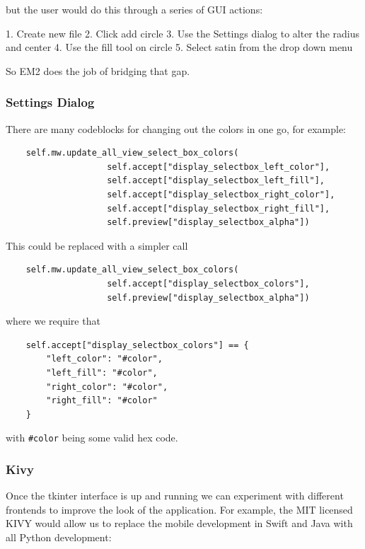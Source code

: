 \documentclass[a4paper, 11pt]{report}
\begin{document}
but the user would do this through a series of GUI actions:

1. Create new file
2. Click add circle
3. Use the Settings dialog to alter the radius and center
4. Use the fill tool on circle
5. Select satin from the drop down menu

So EM2 does the job of bridging that gap.

\subsubsection{Settings Dialog}

There are many codeblocks for changing out the colors in one go, for example:
    
\begin{verbatim}
    self.mw.update_all_view_select_box_colors(
                    self.accept["display_selectbox_left_color"],
                    self.accept["display_selectbox_left_fill"],
                    self.accept["display_selectbox_right_color"],
                    self.accept["display_selectbox_right_fill"],
                    self.preview["display_selectbox_alpha"])
\end{verbatim}

This could be replaced with a simpler call

\begin{verbatim}
    self.mw.update_all_view_select_box_colors(
                    self.accept["display_selectbox_colors"],
                    self.preview["display_selectbox_alpha"])
\end{verbatim}

where we require that

\begin{verbatim}
    self.accept["display_selectbox_colors"] == {
        "left_color": "#color",
        "left_fill": "#color",
        "right_color": "#color",
        "right_fill": "#color"
    }
\end{verbatim}

with \texttt{\#color} being some valid hex code.

\subsubsection{Kivy}

Once the tkinter interface is up and running we can experiment
with different frontends to improve the look of the application.
For example, the MIT licensed KIVY would allow us to replace the 
mobile development in Swift and Java with all Python development:
\end{document}

